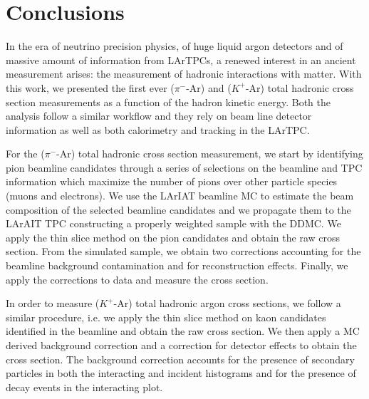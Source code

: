 \chapter{Conclusions}\label{ch:Conclusions}
In the era of neutrino precision physics, of huge liquid argon detectors and of massive amount of information from LArTPCs, a renewed interest in an ancient measurement arises: the measurement of hadronic interactions with matter. With this work, we presented the first ever ($\pi^-$-Ar) and ($K^+$-Ar) total hadronic cross section measurements as a function of the hadron kinetic energy. 
Both the analysis follow a similar workflow and  they rely on beam line detector information as well as both calorimetry and tracking in the LArTPC. 


For the ($\pi^-$-Ar) total hadronic cross section measurement, we start by identifying pion beamline candidates through a series of selections on the beamline and TPC information which maximize the number of pions over other particle species (muons and electrons). We use the LArIAT beamline MC to estimate the beam composition of the selected beamline candidates and we propagate them to the LArAIT TPC constructing a properly weighted sample with the DDMC. We apply the thin slice method on the pion candidates and obtain the raw cross section. From the simulated sample, we obtain two corrections accounting for the beamline background contamination and for reconstruction effects. Finally, we apply the corrections to data and measure the cross section.

In order to measure ($K^+$-Ar) total hadronic  argon cross sections, we follow a similar procedure, i.e. we apply the thin slice method on kaon candidates identified in the beamline and obtain the raw cross section. We then apply a MC derived background correction and a correction for detector effects to obtain the cross section. The background correction accounts for the presence of secondary particles in both the interacting and incident histograms and for the presence of decay events in the interacting plot.

